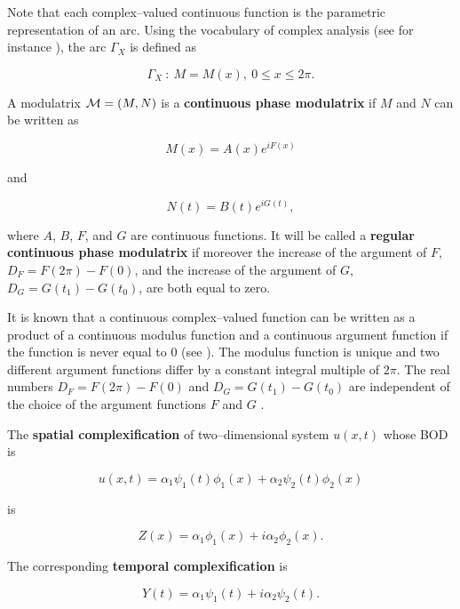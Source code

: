 Note that each complex--valued continuous function 
is the parametric representation of an arc. 
Using the vocabulary of complex analysis 
(see for instance \cite{Henrici}), the arc $\Gamma_X$ is defined as 

\begin{equation}
\Gamma_X\  :\  M=M(x), \ 0\leq x \leq 2\pi .
\end{equation}




\begin{defn}
A modulatrix ${\cal M}=(M,N)$ is a {\bf continuous phase modulatrix}
 if $M$ and $N$ can be written as 

\begin{equation}
M(x)=A(x)e^{iF(x)}
\label{contx}
\end{equation}

and

\begin{equation}
N(t)=B(t)e^{iG(t)},
\label{contt}
\end{equation}

where $A$, $B$, $F$, and $G$ are continuous functions. It will be called 
a {\bf regular continuous phase modulatrix} if moreover the increase 
of the argument of $F$, $D_F=F(2\pi)-F(0)$, and 
the increase of the argument of $G$, $D_G=G(t_1)-G(t_0)$, are both 
equal to zero.
\end{defn}

It is known that a continuous complex--valued function 
can be written as a
 product of a continuous modulus function and a continuous argument
 function if the function is never equal to 0 (see \cite{Henrici}). 
The modulus function is unique and two different argument functions 
differ by a constant integral multiple of $2\pi$.
The real numbers $D_F=F(2\pi)-F(0)$ and $D_G=G(t_1)-G(t_0)$ 
are independent of the choice 
of the argument functions $F$ and $G$ \cite{Henrici}.


\begin{defn}
The {\bf spatial complexification} of two--dimensional system $u(x,t)$
whose BOD is

\begin{equation}
u(x,t)=\alpha_1\psi_1(t)\phi_1(x)+\alpha_2\psi_2(t)\phi_2(x)
\label{bod2d}
\end{equation}

 is 

\begin{equation}
Z(x)=\alpha_1\phi_1(x)+i\alpha_2\phi_2(x).
\end{equation}

The corresponding {\bf temporal complexification} is

\begin{equation}
Y(t)=\alpha_1\psi_1(t)+i\alpha_2\psi_2(t).
\end{equation}

\end{defn}

